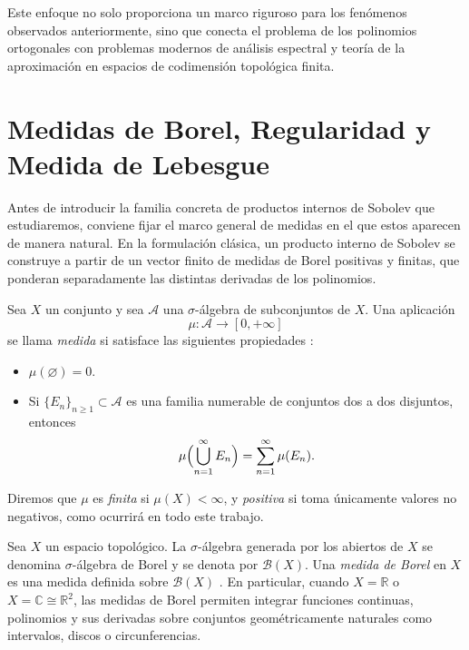 Este enfoque no solo proporciona un marco riguroso para los fenómenos observados anteriormente, sino que conecta el problema de los polinomios ortogonales con problemas modernos de análisis espectral y teoría de la aproximación en espacios de codimensión topológica finita.

\section{Medidas de Borel, Regularidad y Medida de Lebesgue}

Antes de introducir la familia concreta de productos internos de Sobolev que estudiaremos, conviene fijar el marco general de medidas en el que estos aparecen de manera natural. En la formulación clásica, un producto interno de Sobolev se construye a partir de un vector finito de medidas de Borel positivas y finitas, que ponderan separadamente las distintas derivadas de los polinomios.

\begin{defn}[Medida]
	Sea $X$ un conjunto y sea $\mathcal{A}$ una $\sigma$-álgebra de subconjuntos de $X$. Una aplicación
	\[
		\mu : \mathcal{A} \to [0,+\infty]
	\]
	se llama \emph{medida} si satisface las siguientes propiedades \cite{folland1999real,rudin1987real}:
	\begin{itemize}
		\item $\mu(\varnothing)=0$.
		\item Si $\{E_n\}_{n\geq 1} \subset \mathcal{A}$ es una familia numerable de conjuntos dos a dos disjuntos, entonces
		      \[
			      \mu\Bigl(\bigcup_{n=1}^{\infty} E_n\Bigr)=\sum_{n=1}^{\infty}\mu(E_n).
		      \]
	\end{itemize}
	Diremos que $\mu$ es \emph{finita} si $\mu(X)<\infty$, y \emph{positiva} si toma únicamente valores no negativos, como ocurrirá en todo este trabajo.
\end{defn}

\begin{defn}
	Sea $X$ un espacio topológico. La $\sigma$-álgebra generada por los abiertos de $X$ se denomina $\sigma$-álgebra de Borel y se denota por $\mathcal{B}(X)$. Una \emph{medida de Borel} en $X$ es una medida definida sobre $\mathcal{B}(X)$ \cite{folland1999real,bogachev2007measure}. En particular, cuando $X=\mathbb{R}$ o $X=\mathbb{C}\cong\mathbb{R}^2$, las medidas de Borel permiten integrar funciones continuas, polinomios y sus derivadas sobre conjuntos geométricamente naturales como intervalos, discos o circunferencias.
\end{defn}

